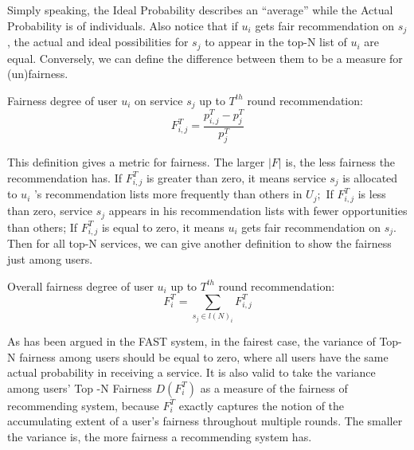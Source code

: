 Simply speaking, the Ideal Probability describes an ``average''
while the Actual Probability is of individuals.
Also notice that
if $u_i$ gets fair recommendation on $s_j$, the actual and ideal possibilities
for $s_j$ to appear in the top-N list of $u_i$ are equal.
Conversely, we can define the difference between them to be 
a measure for (un)fairness.
\begin{definition}
Fairness degree of user $u_{i}$ on service $s_{j}$ up to $T^{t h}$ round recommendation:
\begin{equation}
F_{i, j}^{T}=\frac{p_{i, j}^{T}-p_{j}^{T}}{p_{j}^{T}}
\label{eqn:def_fairness}
\end{equation}
\end{definition}
This definition gives a metric for fairness. The larger $|F|$ is,
the less fairness the recommendation has.
If $F_{i, j}^{T}$ is greater than zero, it means service $s_{j}$ is allocated to $u_{i}$ 's recommendation lists more frequently than others in $U_{j} ;$ If $F_{i, j}^{T}$ is less than zero, service $s_{j}$ appears in his recommendation lists with fewer opportunities than others; If $F_{i, j}^{T}$ is equal to zero, it means $u_{i}$ gets fair recommendation on $s_{j}$.
Then for all top-N services, we can give another definition to show the fairness just among users.
\begin{definition}
Overall fairness degree of user $u_{i}$ up to $T^{t h}$ round recommendation:
\begin{equation}
F_{i}^{T}=\sum_{s_{j} \in l(N)_{i}} F_{i, j}^{T}
\end{equation}
\end{definition}

As has been argued in the FAST system\cite{FAST}, in the fairest case, the variance of Top-N fairness among users should be equal to zero, where all users have the same actual probability in receiving a service. It is also valid to take the variance among users’ Top -N Fairness $D(F_i^T)$ as a measure of the fairness of recommending system, because $F_i^T$ exactly captures the notion of the accumulating extent of a user's fairness throughout multiple rounds. The smaller the variance is, the more
fairness a recommending system has.


